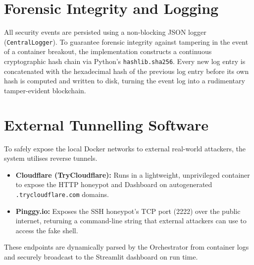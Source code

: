 \section{Forensic Integrity and Logging}

All security events are persisted using a non-blocking JSON logger (\texttt{CentralLogger}). To guarantee forensic integrity against tampering in the event of a container breakout, the implementation constructs a continuous cryptographic hash chain via Python's \texttt{hashlib.sha256}. Every new log entry is concatenated with the hexadecimal hash of the previous log entry before its own hash is computed and written to disk, turning the event log into a rudimentary tamper-evident blockchain.

\section{External Tunnelling Software}

To safely expose the local Docker networks to external real-world attackers, the system utilises reverse tunnels. 
\begin{itemize}
    \item \textbf{Cloudflare (TryCloudflare):} Runs in a lightweight, unprivileged container to expose the HTTP honeypot and Dashboard on autogenerated \texttt{.trycloudflare.com} domains.
    \item \textbf{Pinggy.io:} Exposes the SSH honeypot's TCP port (2222) over the public internet, returning a command-line string that external attackers can use to access the fake shell.
\end{itemize}
These endpoints are dynamically parsed by the Orchestrator from container logs and securely broadcast to the Streamlit dashboard on run time.
